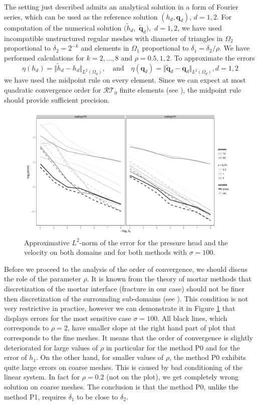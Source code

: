 \documentclass[times]{nlaauth}%
\def\norm#1{\|#1\|}
\def\vc#1{\mathbf{\boldsymbol{#1}}}     %
\def\norm#1{\bigl\Vert#1\bigr\Vert} %
\begin{document}
The setting just described admits an analytical solution in a form of Fourier series, which 
can be used as the reference solution $(h_d, \vc q_d)$, $d=1,2$. 
For computation of the numerical solution $(\tilde h_d$,~$\tilde{\vc{q}}_d)$,~$d=1,2$,
we have used incompatible unstructured regular meshes with diameter of triangles in $\Omega_2$ proportional to $\delta_2=2^{-k}$ 
and elements
in $\Omega_1$ proportional to $\delta_1=\delta_2/\rho$. 
We have performed calculations for $k=2,\dots,8$ and $\rho=0.5, 1, 2$. 
To approximate the errors 
\[
\eta(h_d) = \norm{\tilde{h}_d - h_d}_{L^2(\Omega_d)},
\quad  \text{and} \quad
\eta(\vc q_d) = \norm{\tilde{ \vc q}_d - \vc q_d}_{L^2(\Omega_d)}, d=1,2
\]
we have used the midpoint rule on every element. 
Since we can expect at most quadratic convergence order for $\mathcal{RT}_0$ finite elements (see \cite{vohralik_posteriori_2007}), 
the midpoint rule should provide sufficient precision. 
\begin{figure}[h]
 \centering
 \includegraphics[width=1.00\textwidth, trim=0pt 0pt 23pt 0pt,clip]{./ratio_plot.pdf}
 \caption{Approximative $L^2$-norm of the error for the pressure head and the velocity on both domains and for both methods with $\sigma =100$.}
 \label{fig:ratio}
\end{figure}

Before we proceed to the analysis of the order of convergence, we should discus the role of the parameter $\rho$. 
It is known from the theory of mortar methods that discretization
of the mortar interface (fracture in our case) should not be finer then discretization of the surrounding sub-domains 
(see \cite[Assumption 2.1]{wheeler_efficient_2010}). This condition is not very restrictive in practice, 
however we can demonstrate it in Figure \ref{fig:ratio} that displays errors for the most sensitive case $\sigma=100$.
All black lines, which corresponds to $\rho=2$, have smaller slope at the right hand part of plot that 
corresponds to the fine meshes. 
It means that the order of convergence is slightly deteriorated for large values of $\rho$ in particular for 
the method P0 and for the error of $h_1$. On the other hand, for smaller values of $\rho$, the method P0 exhibits quite large 
errors on coarse meshes. This is caused by bad conditioning of the linear system. In fact for $\rho=0.2$ (not on the plot),
we get completely wrong solution on coarse meshes. The conclusion is that the method P0, unlike the method P1, 
requires $\delta_1$ to be close to $\delta_2$.  
\end{document}
